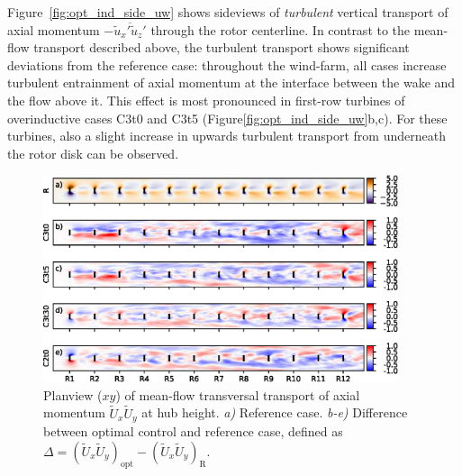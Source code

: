 	Figure~\ref{fig:opt_ind_side_uw} shows sideviews of \emph{turbulent} vertical transport of axial momentum $- \overline{\widetilde{u}_x'\widetilde{u}_z'}$ through the rotor centerline. In contrast to the mean-flow transport described above, the turbulent transport shows significant deviations from the reference case: throughout the wind-farm, all cases increase turbulent entrainment of axial momentum at the interface between the wake and the flow above it. This effect is most pronounced in first-row turbines of overinductive cases C3t0 and C3t5 (Figure\ref{fig:opt_ind_side_uw}b,c). For these turbines, also a slight increase in upwards turbulent transport from underneath the rotor disk can be observed.

\begin{figure}[ht!]
	\centering
	\includegraphics[width=0.93\textwidth]{chapters/optimal_induction_control/topview_uvm.eps}
	\caption[Planview ($xy$) of mean-flow transversal transport of axial momentum $\widetilde{U}_x \widetilde{U}_y$ at hub height.]{Planview ($xy$) of mean-flow transversal transport of axial momentum $\widetilde{U}_x \widetilde{U}_y$ at hub height. \emph{a) } Reference case. \emph{b-e)} Difference between optimal control and reference case, defined as $\Delta = (\widetilde{U}_x \widetilde{U}_y)_{\text{opt}} - (\widetilde{U}_x \widetilde{U}_y)_{\text{R}}$. \label{fig:opt_ind_top_uvm}}
\end{figure}

